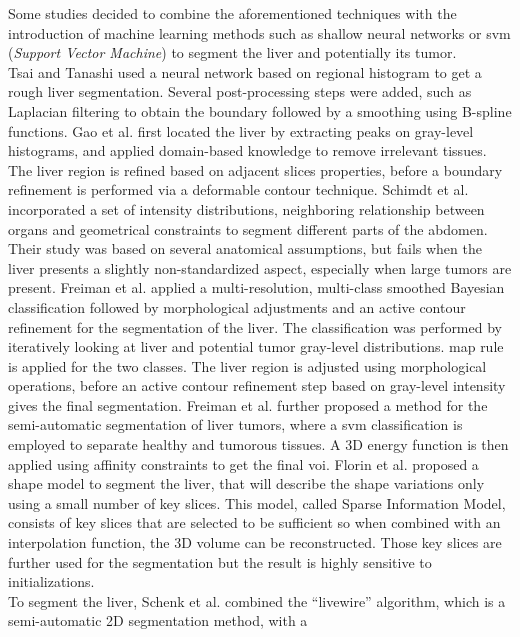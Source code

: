 Some studies decided to combine the aforementioned techniques with the introduction of
machine learning methods such as shallow neural networks or \ac{svm}
(\emph{Support Vector Machine}) to segment the liver and potentially its tumor.\\
Tsai and Tanashi \cite{Tsai1994} used a neural network based on regional histogram to get
a rough liver segmentation. Several post-processing steps were added,
such as Laplacian filtering to obtain the boundary followed by a
smoothing using B-spline functions.
Gao et al. \cite{Gao1996} first located the liver by extracting peaks on gray-level
histograms, and applied domain-based knowledge to remove irrelevant
tissues. The liver region is refined based on adjacent slices
properties, before a boundary refinement is performed via a deformable
contour technique.
Schimdt et al. \cite{Schmidt2007} incorporated a set of intensity distributions,
neighboring relationship between organs and geometrical constraints to
segment different parts of the abdomen. Their study was based on several
anatomical assumptions, but fails when the liver presents a slightly
non-standardized aspect, especially when large tumors are present.
Freiman et al. \cite{Freiman2008} applied a multi-resolution, multi-class smoothed Bayesian
classification followed by morphological adjustments and an active
contour refinement for the segmentation of the liver. The classification
was performed by iteratively looking at liver and potential tumor
gray-level distributions. \ac{map} rule is applied for the two classes. The
liver region is adjusted using morphological operations, before an
active contour refinement step based on gray-level intensity gives the
final segmentation.
Freiman et al. \cite{Freiman2011} further proposed a method for the semi-automatic segmentation of
liver tumors, where a \ac{svm} classification is employed to separate healthy
and tumorous tissues. A 3D energy function is then applied using
affinity constraints to get the final \ac{voi}.
Florin et al. \cite{Florin2007} proposed a shape model to segment the liver, that will describe the shape
variations only using a small number of key slices. This model, called Sparse Information Model, consists of key slices that are selected to be
sufficient so when combined with an interpolation function, the 3D
volume can be reconstructed. Those key slices are further used for the
segmentation but the result is highly sensitive to initializations.\\
To segment the liver, Schenk et al. \cite{Schenk2000} combined the ``livewire'' algorithm, which is a semi-automatic 2D segmentation method, with a
